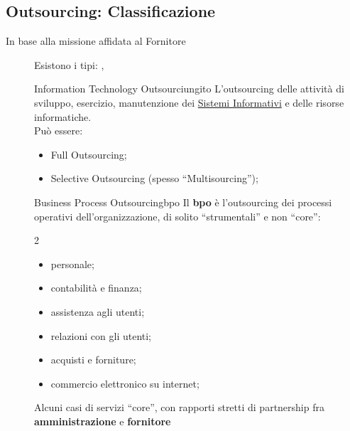 \subsection{Outsourcing: Classificazione}\label{sub:cv_outsourcing_classificazione} %
\begin{description}
    \item[In base alla missione affidata al Fornitore] Esistono i tipi: , 
        \begin{definition}{Information Technology Outsourciung}{ito}
            L'outsourcing delle attività di sviluppo, esercizio, manutenzione dei \hyperref[sub:il_sistema_informativo]{Sistemi Informativi} e delle risorse informatiche.
            \\
            Può essere:
            \begin{itemize}
                \item Full Outsourcing;
                \item Selective Outsourcing (spesso ``Multisourcing'');
            \end{itemize}
        \end{definition}
        \begin{definition}{Business Process Outsourcing}{bpo}
            Il \textbf{\ac{bpo}} è l'outsourcing dei processi operativi dell'organizzazione, di solito ``strumentali'' e non ``core'':
            \begin{multicols}{2}
                \begin{itemize}
                    \item personale;
                    \item contabilità e finanza;
                    \item assistenza agli utenti;
                    \item relazioni con gli utenti;
                    \item acquisti e forniture;
                    \item commercio elettronico su internet;
                \end{itemize}
            \end{multicols}
            \begin{note}
                Alcuni casi di servizi ``core'', con rapporti stretti di partnership fra \textbf{amministrazione} e \textbf{fornitore}
            \end{note}
        \end{definition}

\end{description}
